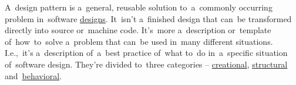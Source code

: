 \label{designpatterns}
A~design pattern is a~general, reusable solution to~a~commonly occurring problem in~software \hyperref[architecturedesign]{designs}.
It~isn't a~finished design that can~be transformed directly into source or~machine code.
It's~more a~description or~template of~how~to~solve a~problem that can~be used in~many different situations.
I.e.,~it's a~description of~a~best practice of~what to~do in~a~specific situation of~software design.
They're divided to~three categories -- \hyperref[creationaldp]{creational}, \hyperref[structuraldp]{structural} and~\hyperref[behavioraldp]{behavioral}.

\label{creationaldp}

\label{factorydp}

\label{singletondp}

\label{prototypedp}

\label{structuraldp}

\label{proxydp}

\label{compositedp}

\label{behavioraldp}

\label{nulldp}

\label{templatedp}
